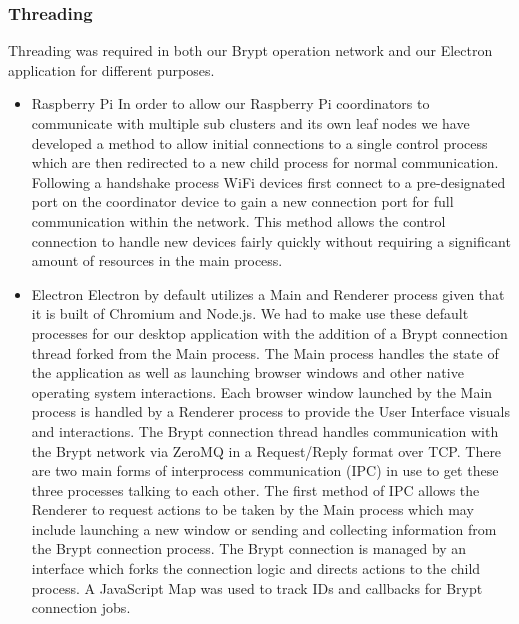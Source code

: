 \documentclass[tikz,a4paper,titlepage]{article}
\begin{document}
\subsubsection{Threading}
Threading was required in both our Brypt operation network and our Electron application for different purposes. 
\begin{itemize}
    \item Raspberry Pi
    \newline
    In order to allow our Raspberry Pi coordinators to communicate with multiple sub clusters and its own leaf nodes we have developed a method to allow initial connections to a single control process which are then redirected to a new child process for normal communication. Following a handshake process WiFi devices first connect to a pre-designated port on the coordinator device to gain a new connection port for full communication within the network. This method allows the control connection to handle new devices fairly quickly without requiring a significant amount of resources in the main process. 
    \item Electron
    \newline
    Electron by default utilizes a Main and Renderer process given that it is built of Chromium and Node.js. We had to make use these default processes for our desktop application with the addition of a Brypt connection thread forked from the Main process. The Main process handles the state of the application as well as launching browser windows and other native operating system interactions. Each browser window launched by the Main process is handled by a Renderer process to provide the User Interface visuals and interactions. The Brypt connection thread handles communication with the Brypt network via ZeroMQ in a Request/Reply format over TCP. There are two main forms of interprocess communication (IPC) in use to get these three processes talking to each other. The first method of IPC allows the Renderer to request actions to be taken by the Main process which may include launching a new window or sending and collecting information from the Brypt connection process. The Brypt connection is managed by an interface which forks the connection logic and directs actions to the child process. A JavaScript Map was used to track IDs and callbacks for Brypt connection jobs. 
\end{itemize}
\end{document}
